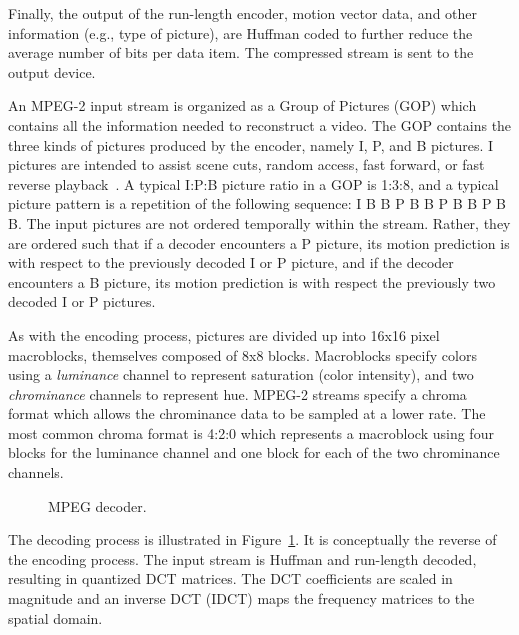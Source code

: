 Finally, the output of the run-length encoder, motion vector data,
and other information (e.g., type of picture), are Huffman coded to 
further reduce the average number of bits per data item. The compressed
stream is sent to the output device.


An MPEG-2 input stream is organized as a Group of Pictures (GOP)
which contains all the information needed to reconstruct a video. The
GOP contains the three kinds of pictures produced by the encoder,
namely I, P, and B pictures. I pictures are intended to assist scene
cuts, random access, fast forward, or fast reverse
playback~\cite{MPEG2, Page 14 6.1.1.7}. A typical I:P:B picture ratio
in a GOP is 1:3:8, and a typical picture pattern is a
repetition of the following sequence: I B B P B B P B B P B B. The
input pictures are not ordered temporally within the stream. Rather,
they are ordered such that if a decoder encounters a P picture, its
motion prediction is with respect to the previously decoded I or P
picture, and if the decoder encounters a B picture, its motion
prediction is with respect the previously two decoded I or P pictures.

As with the encoding process, pictures are divided up into 16x16 pixel
macroblocks, themselves composed of 8x8 blocks. Macroblocks
specify colors using a {\it luminance} channel to represent saturation
(color intensity), and two {\it chrominance} channels to represent
hue. MPEG-2 streams specify a chroma format which allows the
chrominance data to be sampled at a lower rate. The most common chroma 
format is 4:2:0 which represents a macroblock using four blocks for the
luminance channel and one block for each of the two chrominance
channels. 

\begin{figure}[t]
\begin{center}
\vspace{-12pt}
 \caption{MPEG decoder.}
 \label{fig:mpeg-decoder}
\end{center}
\end{figure}

The decoding process is illustrated in
Figure~\ref{fig:mpeg-decoder}. It is conceptually the reverse of the
encoding process. The input stream is Huffman and run-length decoded,
resulting in quantized DCT matrices. The DCT coefficients are scaled
in magnitude and an inverse DCT (IDCT) maps the frequency matrices to
the spatial domain.

